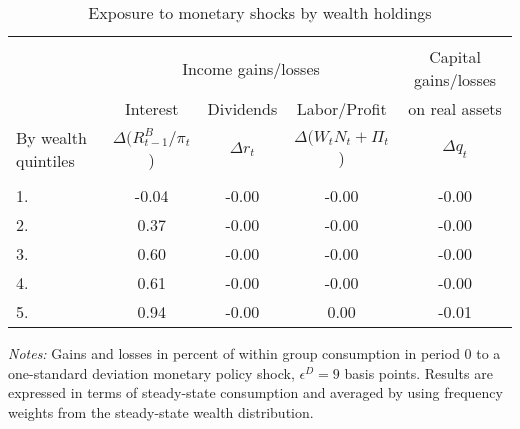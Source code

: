 \begin{table} \caption{Exposure to monetary shocks by wealth holdings} \label{Tab:RD} 
\begin{center}
\begin{threeparttable}
\begin{tabular*}{\textwidth}{l @{\extracolsep{\fill}} cccc}
 \hline \hline 
\\ &\multicolumn{3}{c}{Income gains/losses} & Capital gains/losses   \\ \cline{2-4} 
                       & Interest  &  Dividends  & Labor/Profit & on real assets    \\
By wealth quintiles     & $\Delta (R^B_{t-1}/\pi_t$)   & $\Delta r_t$ &  $\Delta (W_tN_t+\Pi_t$) & $\Delta q_t$   \\ \hline 
\\ 1.   &       -0.04 &    -0.00 &    -0.00 &    -0.00 
\\ 2.  &        0.37 &    -0.00 &    -0.00 &    -0.00 
\\ 3.  &        0.60 &    -0.00 &    -0.00 &    -0.00 
\\ 4.  &        0.61 &    -0.00 &    -0.00 &    -0.00 
\\ 5.  &        0.94 &    -0.00 &     0.00 &    -0.01 
\\ \hline 
\end{tabular*} 
\begin{small}
\begin{tablenotes}
\item \textit{Notes:} Gains and losses in percent of within group consumption in period 0 to a one-standard deviation monetary policy shock, $\epsilon^D=9$ basis points. Results are expressed in terms of steady-state consumption and averaged by using frequency weights from the steady-state wealth distribution. 
\end{tablenotes}
\end{small}
\end{threeparttable}
\end{center}
\end{table}
